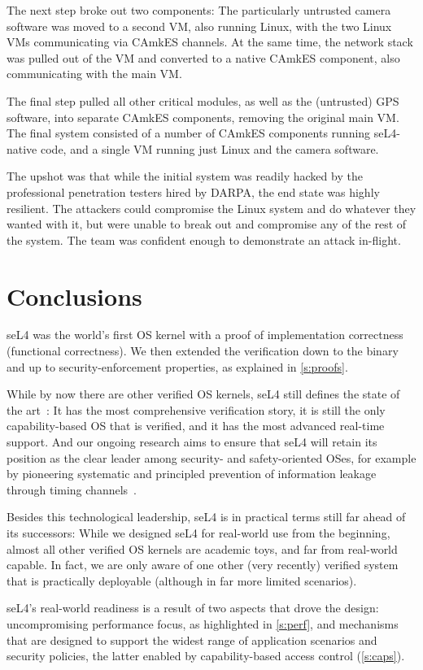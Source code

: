 \documentclass[english,a4paper,12pt\ifDraft,draft\fi]{report}
\newcommand{\Sect}[1]{\section{#1}}
\newcommand{\Sect}[1]{\chapter{#1}}
\begin{document}
  The next step broke out two components: The particularly untrusted
  camera software was moved to a second VM, also running Linux, with
  the two Linux VMs communicating via CAmkES channels. At the same
  time, the network stack was pulled out of the VM and converted to a
  native CAmkES component, also communicating with the main VM.

  The final step pulled all other critical modules, as well as the
  (untrusted) GPS software, into separate CAmkES components, removing
  the original main VM. The final system consisted of a number of
  CAmkES components running seL4-native code, and a single VM running
  just Linux and the camera software.

  The upshot was that while the initial system was readily hacked by
  the professional penetration testers hired by DARPA, the end state was highly
  resilient. The attackers could compromise the Linux system and do
  whatever they wanted with it, but were unable to break out and
  compromise any of the rest of the system. The team was confident
  enough to demonstrate an attack in-flight.

  \Sect{\label{s:concl}Conclusions}

  seL4 was the world's first OS kernel with a proof of implementation
  correctness (functional correctness). We then extended the
  verification down to the
  binary and up to security-enforcement properties, as explained in
  \autoref{s:proofs}.

  While by now there are other verified OS kernels, seL4 still defines
  the state of the art~\citep{Heiser:10y-blog}: It has the most
  comprehensive verification story, it is still the only
  capability-based OS that is verified, and it has the most advanced
  real-time support. And our ongoing research aims to ensure that
  seL4 will retain its position as the clear leader among security-
  and safety-oriented OSes, for example by pioneering systematic and
  principled prevention of information leakage through timing
  channels~\citep{Ge_YCH_19}.

  Besides this technological leadership, seL4 is in practical terms
  still far ahead of its successors: While we designed seL4 for
  real-world use from the beginning, almost all other verified OS
  kernels are academic toys, and far from real-world capable. In fact, we
  are only aware of one other (very recently) verified system that is
  practically deployable (although in far more limited scenarios).

  seL4's real-world readiness is a result of two aspects that drove
  the design: uncompromising performance focus, as highlighted in
  \autoref{s:perf}, and mechanisms that are designed to support the
  widest range of application scenarios and security policies, the
  latter enabled by capability-based access control
  (\autoref{s:caps}).
\end{document}
